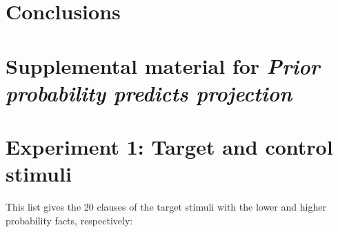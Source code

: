 \documentclass[11pt,fleqn]{article}
\newcommand{\6}{\mbox{$[\hspace*{-.6mm}[$}}
\newcommand{\9}{\mbox{$]\hspace*{-.6mm}]$}}
\begin{document}
\section{Conclusions}\label{s5}





\newpage

\appendix

\setcounter{table}{0}
\renewcommand{\thetable}{A\arabic{table}}

\setcounter{figure}{0}
\renewcommand{\thefigure}{A\arabic{figure}}

\section*{Supplemental material for {\em Prior probability predicts projection}}

\section{Experiment 1: Target and control stimuli}\label{a-stim}

This list gives the 20 clauses of the target stimuli with the lower and higher probability facts, respectively:
\end{document}
